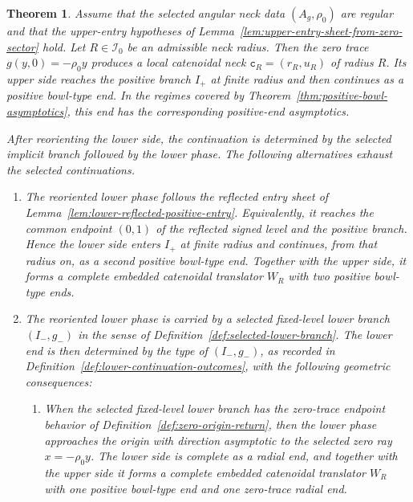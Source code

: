 \documentclass{amsart}
\theoremstyle{plain}
\newtheorem{theorem}{Theorem}[section]
\theoremstyle{mainintrothm}
\theoremstyle{definition}
\begin{document}
\begin{theorem}
	\label{thm:rotational-translators}
	Assume that the selected angular neck data $(A_g,\rho_0)$ are regular and
	that the upper-entry hypotheses of
	Lemma~\ref{lem:upper-entry-sheet-from-zero-sector} hold.  Let
	$R\in\mathcal I_0$ be an admissible neck radius.  Then the zero trace
	$g(y,0)=-\rho_0y$ produces a local catenoidal neck
	$\mathtt c_R=(r_R,u_R)$ of radius $R$.  Its upper side reaches the positive
	branch $I_+$ at finite radius and then continues as a positive bowl-type
	end.  In the regimes covered by
	Theorem~\ref{thm:positive-bowl-asymptotics}, this end has the corresponding
	positive-end asymptotics.
	
	After reorienting the lower side, the continuation is determined by the
	selected implicit branch followed by the lower phase.  The following
	alternatives exhaust the selected continuations.
	
	\begin{enumerate}[label=\textup{(\roman*)}]
		\item  The reoriented lower phase follows the reflected entry sheet of
		Lemma~\ref{lem:lower-reflected-positive-entry}.  Equivalently, it reaches
		the common endpoint $(0,1)$ of the reflected signed level and the
		positive branch.  Hence the lower side enters $I_+$ at finite radius and
		continues, from that radius on, as a second positive bowl-type end.
		Together with the upper side, it forms a complete embedded catenoidal
		translator $W_R$ with two positive bowl-type ends.
		
		\item The reoriented lower phase is carried by a selected fixed-level lower
		branch $(I_-,g_-)$ in the sense of Definition~\ref{def:selected-lower-branch}. The lower end is then determined by the type of $(I_-,g_-)$, as recorded
		in Definition~\ref{def:lower-continuation-outcomes}, with the following
		geometric consequences:
		
		\begin{enumerate}[label=\textup{(\alph*)}]
			\item When the selected fixed-level lower branch has the zero-trace endpoint
			behavior of Definition~\ref{def:zero-origin-return}, then the lower
			phase approaches the origin with direction asymptotic to the selected
			zero ray $x=-\rho_0y$.  The lower side is complete as a radial end,
			and together with the upper side it forms a complete embedded
			catenoidal translator $W_R$ with one positive bowl-type end and one
			zero-trace radial end.
			

\end{enumerate}
\end{enumerate}
\end{theorem}
\end{document}
